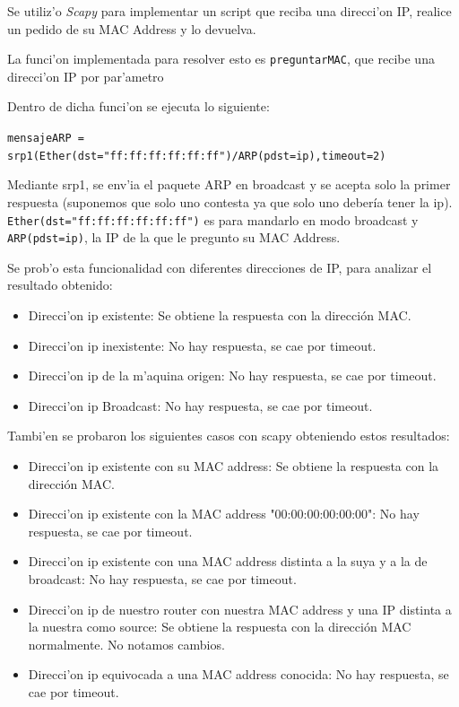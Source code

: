 \documentclass[a4paper,10pt]{article}
\begin{document}
Se utiliz'o \textit{Scapy} para implementar un script que reciba una direcci'on IP, realice un pedido de su MAC Address y lo devuelva.

La funci'on implementada para resolver esto es \texttt{preguntarMAC}, que recibe una direcci'on IP por par'ametro

Dentro de dicha funci'on se ejecuta lo siguiente:

\vspace*{5 mm}
\texttt{mensajeARP = srp1(Ether(dst="ff:ff:ff:ff:ff:ff")/ARP(pdst=ip),timeout=2)}
\vspace*{5 mm}

Mediante srp1, se env'ia el paquete ARP en broadcast y se acepta solo la primer respuesta (suponemos que solo uno contesta ya que solo uno debería tener la ip). \texttt{Ether(dst="ff:ff:ff:ff:ff:ff")} es para mandarlo en modo broadcast y \texttt{ARP(pdst=ip)}, la IP de la que le pregunto su MAC Address.

\vspace*{5 mm}
Se prob'o esta funcionalidad con diferentes direcciones de IP, para analizar el resultado obtenido:

\begin{itemize}
	\item Direcci'on ip existente: Se obtiene la respuesta con la dirección MAC.
	\item Direcci'on ip inexistente: No hay respuesta, se cae por timeout.
	\item Direcci'on ip de la m'aquina origen: No hay respuesta, se cae por timeout.
	\item Direcci'on ip Broadcast: No hay respuesta, se cae por timeout.
\end{itemize}

Tambi'en se probaron los siguientes casos con scapy obteniendo estos resultados:

\begin{itemize}
	\item Direcci'on ip existente con su MAC address: Se obtiene la respuesta con la dirección MAC.
	\item Direcci'on ip existente con la MAC address "00:00:00:00:00:00": No hay respuesta, se cae por timeout.
	\item Direcci'on ip existente con una MAC address distinta a la suya y a la de broadcast: No hay respuesta, se cae por timeout.
	\item Direcci'on ip de nuestro router con nuestra MAC address y una IP distinta a la nuestra como source: Se obtiene la respuesta con la dirección MAC normalmente. No notamos cambios.
	\item Direcci'on ip equivocada a una MAC address conocida: No hay respuesta, se cae por timeout.
\end{itemize}
\end{document}
